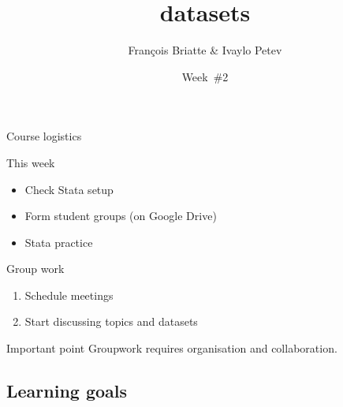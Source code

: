 \documentclass[t]{beamer}
\title{datasets}
\author{François Briatte \& Ivaylo Petev}
\date{Week~\#2}
\begin{document}

	\begin{frame}[t]{Course logistics}
	
		\begin{block}{This week}
	    		\begin{itemize}
    	    			\item Check Stata setup
		        \item Form student groups (on Google Drive)
	    		    \item Stata practice
		    \end{itemize}
		 \end{block}

		\begin{block}{Group work}
	        		\begin{enumerate}
	        			\item Schedule meetings
		        		\item Start discussing topics and datasets
		        	\end{enumerate}		
		\end{block}

     \begin{alertblock}{Important point}
       Groupwork requires organisation and collaboration.
     \end{alertblock}
	
	 \end{frame}

  \subsection{Learning goals}
\end{document}
